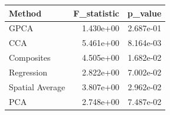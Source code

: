 \begin{tabular}{lrr}
\toprule
Method & F_statistic & p_value \\
\midrule
GPCA & 1.430e+00 & 2.687e-01 \\
CCA & 5.461e+00 & 8.164e-03 \\
Composites & 4.505e+00 & 1.682e-02 \\
Regression & 2.822e+00 & 7.002e-02 \\
Spatial Average & 3.807e+00 & 2.962e-02 \\
PCA & 2.748e+00 & 7.487e-02 \\
\bottomrule
\end{tabular}
